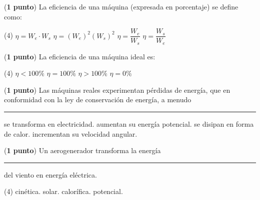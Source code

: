 \documentclass[12pt, letter]{exam}
\begin{document}
\begin{questions}
    \question (\textbf{1 punto}) La eficiencia de una máquina (expresada en porcentaje) se define como:
    \begin{tasks}(4)
        \task $\eta = W_{e} \cdot W_{s}$
        \task $\eta = (W_{e})^2 (W_{s})^2$
        \task $\eta = \dfrac{W_{e}}{W_{s}}$
        \task $\eta = \dfrac{W_{s}}{W_{e}}$
    \end{tasks}
    \question (\textbf{1 punto}) La eficiencia de una máquina ideal es:
    \begin{tasks}(4)
        \task $\eta < 100 \%$
        \task $\eta = 100 \%$
        \task $\eta > 100 \%$
        \task $\eta = 0 \%$
    \end{tasks}
    \question (\textbf{1 punto}) Las máquinas reales experimentan pérdidas de energía, que en conformidad con la ley de conservación de energía, a menudo \rule{2cm}{0.1mm}
    \begin{multicols}{2}
    \begin{tasks}
        \task se transforma en electricidad.
        \task aumentan su energía potencial.
        \task se disipan en forma de calor.
        \task incrementan su velocidad angular.
    \end{tasks}
    \end{multicols}
    \question (\textbf{1 punto}) Un aerogenerador transforma la energía \rule{2cm}{0.1mm} del viento en energía eléctrica.
    \begin{tasks}(4)
        \task cinética.
        \task solar.
        \task calorífica.
        \task potencial.
    \end{tasks}
\end{questions}

\newpage
\end{document}
